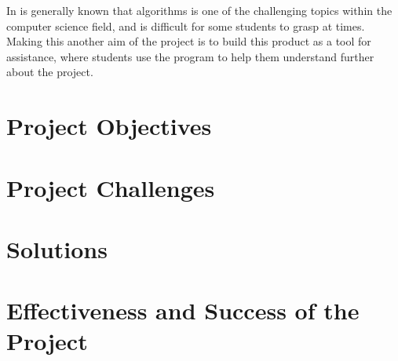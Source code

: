 In is generally known that algorithms is one of the challenging topics within the computer science field, and is difficult for some students to grasp at times. Making this another aim of the project is to build this product as a tool for assistance, where students use the program to help them understand further about the project.

\section{Project Objectives}

\section{Project Challenges}

\section{Solutions}

\section{Effectiveness and Success of the Project}